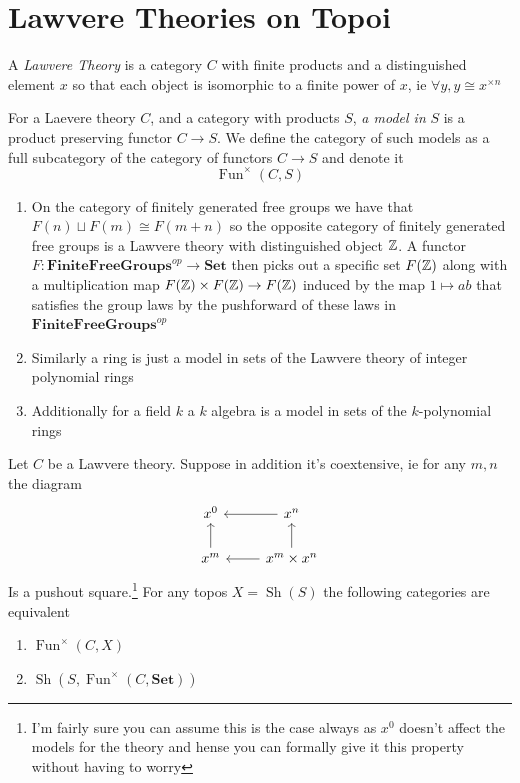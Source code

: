 \documentclass{article}
\begin{document}
\section{Lawvere Theories on Topoi}
\begin{definition}
    A \textit{Lawvere Theory} is a category $C$ with finite products and a distinguished element $x$ so that each object is isomorphic to a finite power of $x$, ie $\forall y, y \cong x^{\times n}$
\end{definition}
\begin{definition}
    For a Laevere theory $C$, and a category with products $S$, \textit{a model in} $\mathit{S}$ is a product preserving functor $C \to S$. We define the category of such models as a full subcategory of the category of functors $C \to S$ and denote it
    \[
    \operatorname{Fun}^\times(C, S)
    \]
\end{definition}
\begin{example}
    \begin{enumerate}
        \item On the category of finitely generated free groups we have that $F(n) \sqcup F(m) \cong F(m+n)$ so the opposite category of finitely generated free groups is a Lawvere theory with distinguished object $\mathbb{Z}$. A functor $F:\mathbf{FiniteFreeGroups}^{op} \to \mathbf{Set}$ then picks out a specific set $F(\mathbb{Z})$ along with a multiplication map $F(\mathbb{Z})\times F(\mathbb{Z}) \to F(\mathbb{Z})$ induced by the map $1 \mapsto ab$ that satisfies the group laws by the pushforward of these laws in $\mathbf{FiniteFreeGroups}^{op}$
        \item Similarly a ring is just a model in sets of the Lawvere theory of integer polynomial rings
        \item Additionally for a field $k$ a $k$ algebra is a model in sets of the $k$-polynomial rings
    \end{enumerate}
\end{example}
\begin{lemma}
    Let $C$ be a Lawvere theory. Suppose in addition it's coextensive, ie for any $m,n$ the diagram
    \[
    \begin{tikzcd}
x^0           & x^n \arrow[l]                      \\
x^m \arrow[u] & x^m \times x^n \arrow[l] \arrow[u]
\end{tikzcd}
    \]
    Is a pushout square.\footnote{I'm fairly sure you can assume this is the case always as $x^0$ doesn't affect the models for the theory and hense you can formally give it this property without having to worry}
    \newline
    For any topos $X=\operatorname{Sh}(S)$ the following categories are equivalent 
    \begin{enumerate}
        \item $\operatorname{Fun}^\times(C,X)$
        \item $\operatorname{Sh}(S,\operatorname{Fun}^\times(C,\mathbf{Set}))$
    \end{enumerate}
\end{lemma}
\end{document}
